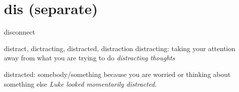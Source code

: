 \chapter{dis (separate)}

\begin{word}{disconnect}
\end{word}

\begin{word}{distract, dictracting, distracted, distraction}
    distracting: taking your attention away from what you are trying to do
    \textit{distracting thoughts}

    distracted: somebody/something because you are worried or thinking about something else
    \textit{Luke looked momentarily distracted.}
\end{word}